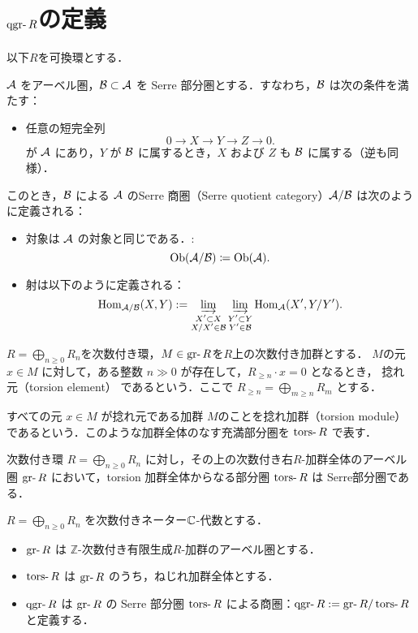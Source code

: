 \section{$\qgr R$の定義}

以下$R$を可換環とする．
\begin{defn}
${\mathcal A}$ をアーベル圏，${\mathcal B} \subset {\mathcal A}$ を Serre 部分圏とする．すなわち，${\mathcal B}$ は次の条件を満たす：
\begin{itemize}
  \item 任意の短完全列
  \[
  0 \to X \to Y \to Z \to 0.
  \]
  が ${\mathcal A}$ にあり，$Y$ が ${\mathcal B}$ に属するとき，$X$ および $Z$ も ${\mathcal B}$ に属する（逆も同様）．
\end{itemize}
このとき，${\mathcal B}$ による ${\mathcal A}$ のSerre 商圏（Serre quotient category）${\mathcal A}/{\mathcal B}$ は次のように定義される：
\begin{itemize}
  \item 対象は ${\mathcal A}$ の対象と同じである．:
		\[\mathrm{Ob}({\mathcal A}/{\mathcal B})\coloneq \mathrm{Ob}({\mathcal A}).\]
  \item 射は以下のように定義される：
  \[
  \operatorname{\mathrm{Hom}}_{{\mathcal A}/{\mathcal B}}(X, Y) := \varinjlim_{\substack{X' \subset X\\ X/X' \in {\mathcal B}}} \varinjlim_{\substack{Y' \subset Y\\ Y' \in {\mathcal B}}} \operatorname{\mathrm{Hom}}_{{\mathcal A}}(X', Y/Y').
  \]
\end{itemize}
\end{defn}
	
\begin{defn}
	 \( R = \bigoplus_{n \ge 0} R_n \)を次数付き環，\( M \in \gr R \)を$R$上の次数付き加群とする． $M$の元\( x \in M \) に対して，ある整数 \( n \gg 0 \) が存在して，\( R_{\ge n} \cdot x = 0 \) となるとき， 捻れ元（torsion element） であるという．ここで \( R_{\ge n} = \bigoplus_{m \ge n} R_m \) とする．

すべての元 \( x \in M \) が捻れ元である加群 \( M \)のことを捻れ加群（torsion module） であるという．このような加群全体のなす充満部分圏を \(\tors R\) で表す．
\end{defn}

\begin{prop}
次数付き環 \( R = \bigoplus_{n \ge 0} R_n \) に対し，その上の次数付き右$R$-加群全体のアーベル圏 \(\gr R\) において，torsion 加群全体からなる部分圏 \(\tors R\) は Serre部分圏である．
\end{prop}

\begin{defn}\cite{AZ94}
\(
R = \bigoplus_{n \ge 0} R_n
\) を次数付きネーター${\mathbb C}$-代数とする．\vspace{-3mm}
\begin{itemize}
  \item $\gr R$ は $\mathbb{Z}$-次数付き有限生成$R$-加群のアーベル圏とする．
  \item $\tors R$ は $\gr R$ のうち，ねじれ加群全体とする．
  \item $\qgr R$ は $\gr R$ の Serre 部分圏 $\tors R$ による商圏：$\qgr R := \gr R / \tors R$ と定義する．
\end{itemize}
\end{defn}

